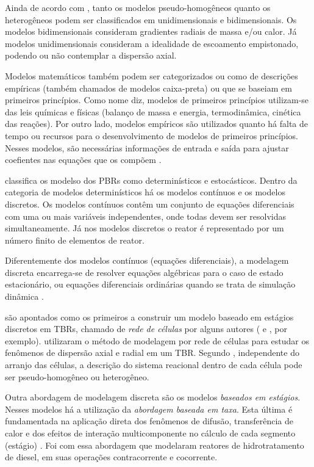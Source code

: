 Ainda de acordo com , tanto os modelos pseudo-homogêneos
quanto os heterogêneos podem ser classificados em unidimensionais e
bidimensionais. Os modelos bidimensionais consideram gradientes radiais de massa
e/ou calor. Já modelos unidimensionais consideram a idealidade de escoamento
empistonado, podendo ou não contemplar a dispersão axial.

Modelos matemáticos também podem ser categorizados ou como de
descrições empíricas (também chamados de modelos caixa-preta) ou que se baseiam
em primeiros princípios. Como nome diz, modelos de primeiros princípios
utilizam-se das leis químicas e físicas (balanço de massa e energia,
termodinâmica, cinética das reações). Por outro lado, modelos empíricos são
utilizados quanto há falta de tempo ou recursos para o desenvolvimento de
modelos de primeiros princípios. Nesses modelos, são necessárias informações de
entrada e saída para ajustar coefientes nas equações que os compõem
\cite{Edgar2001}.

\cite{Lamb1963} classifica os modelso dos PBRs como determinísticos e
estocásticos. Dentro da categoria de modelos determinísticos há os modelos
contínuos e os modelos discretos. Os modelos contínuos contêm um conjunto de
equações diferenciais com uma ou mais variáveis independentes, onde todas devem
ser resolvidas simultaneamente. Já nos modelos discretos o reator é representado
por um número finito de elementos de reator.

Diferentemente dos modelos contínuos (equações diferenciais), a modelagem
discreta encarrega-se de resolver equações algébricas para o caso de estado
estacionário, ou equações diferenciais ordinárias quando se trata de simulação
dinâmica \cite{Schnitzlein1987}.

 são apontados como os primeiros a construir um modelo
baseado em estágios discretos em TBRs, chamado de \emph{rede de células} por
alguns autores ( e , por
exemplo).  utilizaram o método de modelagem por rede
de células para estudar os fenômenos de dispersão axial e radial em um TBR.
Segundo , independente do arranjo das células, a
descrição do sistema reacional dentro de cada célula pode ser pseudo-homogêneo ou
heterogêneo.

Outra abordagem de modelagem discreta são os modelos \emph{baseados em
estágios}. Nesses modelos há a utilização da \emph{abordagem baseada em taxa}.
Esta última é fundamentada na aplicação direta dos fenômenos de difusão,
transferência de calor e dos efeitos de interação multicomponente no cálculo de
cada segmento (estágio) \cite{Jakobsson2004}. Foi com essa abordagem que
 modelaram reatores de hidrotratamento de diesel, em
suas operações contracorrente e cocorrente.

